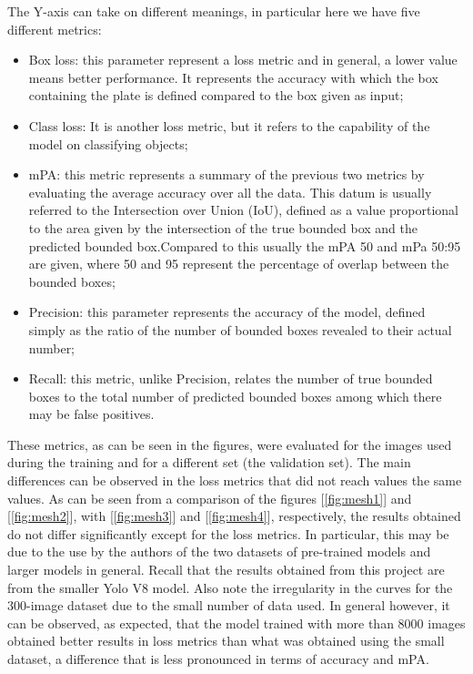 \documentclass[12pt]{article}
\begin{document}
The Y-axis can take on different meanings, in particular here we have five different metrics:
\begin{itemize}
    \item Box loss: this parameter represent a loss metric and in general, a lower value means better performance. It represents the accuracy with which the box containing the plate is defined compared to the box given as input;
    \item Class loss: It is another loss metric, but it refers to the capability of the model on classifying objects;
    \item mPA: this metric represents a summary of the previous two metrics by evaluating the average accuracy over all the data. This datum is usually referred to the Intersection over Union (IoU), defined as a value proportional to the area given by the intersection of the true bounded box and the predicted bounded box.Compared to this usually the mPA 50 and mPa 50:95 are given, where 50 and 95 represent the percentage of overlap between the bounded boxes;
    \item Precision: this parameter represents the accuracy of the model, defined simply as the ratio of the number of bounded boxes revealed to their actual number;
    \item Recall: this metric, unlike Precision,  relates the number of true bounded boxes to the total number of predicted bounded boxes among which there may be false positives.
\end{itemize}

These metrics, as can be seen in the figures, were evaluated for the images used during the training and for a different set (the validation set). The main differences can be observed in the loss metrics that did not reach values the same values. As can be seen from a comparison of the figures [\ref{fig:mesh1}] and [\ref{fig:mesh2}], with [\ref{fig:mesh3}] and [\ref{fig:mesh4}], respectively, the results obtained do not differ significantly except for the loss metrics. In particular, this may be due to the use by the authors of the two datasets of pre-trained models and larger models in general. Recall that the results obtained from this project are from the smaller Yolo V8 model. Also note the irregularity in the curves for the 300-image dataset due to the small number of data used.
In general however, it can be observed, as expected, that the model trained with more than 8000 images obtained better results in loss metrics than what was obtained using the small dataset, a difference that is less pronounced in terms of accuracy and mPA.
\end{document}
